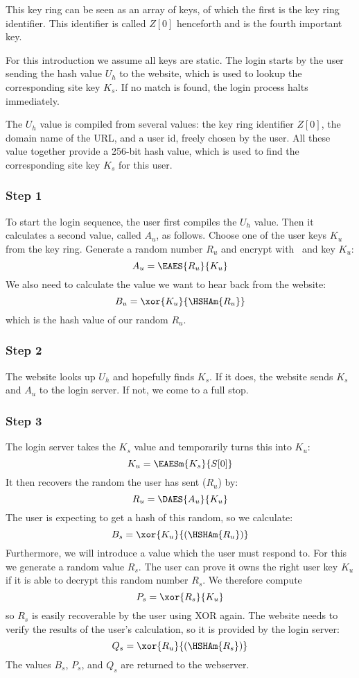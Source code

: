 This key ring can be seen as an array of keys,
of which the first is the key ring identifier.
This identifier is called $Z[0]$ henceforth and is the
fourth important key.
\par
For this introduction we assume all keys are static.
The login starts by the user sending the hash value $U_h$ to the website,
which is used to lookup the corresponding site key $K_s$.
If no match is found,
the login process halts immediately.
\par
The $U_h$ value is compiled from several values:
the key ring identifier $Z[0]$,
the domain name of the URL,
and a user id, freely chosen by the user.
All these value together provide a 256-bit hash value,
which is used to find the corresponding site key $K_s$ for this user.
\subsubsection{Step 1}
To start the login sequence,
the user first compiles the $U_h$ value.
Then it calculates a second value, called $A_u$, as follows.
Choose one of the user keys $K_u$ from the key ring.
Generate a random number $R_u$ and encrypt with \AES\ and key $K_u$:
\[A_u=\EAES{R_u}{K_u}\]
We also need to calculate the value we want to hear back from the website:
\[B_u=\xor{K_u}{\HSHAm{R_u}}\]
which is the hash value of our random $R_u$.
\subsubsection{Step 2}
The website looks up $U_h$ and hopefully finds $K_s$.
If it does, the website sends $K_s$ and $A_u$ to the login server.
If not, we come to a full stop.
\subsubsection{Step 3}
The login server takes the $K_s$ value and temporarily turns this into $K_u$:
\[K_u=\EAESm{K_s}{S[0]}\]
It then recovers the random the user has sent ($R_u$) by:
\[R_u=\DAES{A_u}{K_u}\]
The user is expecting to get a hash of this random, so we calculate:
\[B_s=\xor{K_u}{(\HSHAm{R_u})}\]
Furthermore, we will introduce a value which the user must respond to.
For this we generate a random value $R_s$.
The user can prove it owns the right user key $K_u$ if it is able to decrypt this random number $R_s$.
We therefore compute
\[P_s=\xor{R_s}{K_u}\]
so $R_s$ is easily recoverable by the user using XOR again.
The website needs to verify the results of the user's calculation,
so it is provided by the login server:
\[Q_s=\xor{R_u}{(\HSHAm{R_s})}\]
The values $B_s$, $P_s$, and $Q_s$ are returned to the webserver.
